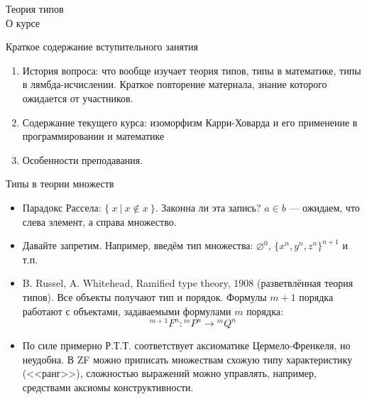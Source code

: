 \documentclass[aspectratio=169]{beamer}
\begin{document}
\newtheorem{dfn}{Определение}[section]
\newtheorem{nte}{Замечание}[section]

\newtheorem{axiom}{Аксиома}[section]
\newtheorem{thm}{Теорема}[section]
\newtheorem{lmm}[theorem]{Лемма}
\newtheorem{statement}{Утверждение}[section]
\newtheorem{oun_paragraph}{Пункт}[section]
\newtheorem{cons}{Следствие}[section]
\newtheorem*{exm}{Пример}

\newcommand{\comb}[1]{\operatorname{\mathcal{#1}}}
\newcommand{\func}[1]{\operatorname{#1}}
\newcommand{\reduction}[1]{{\color{OrangeRed}#1}}
\newcommand{\set}[1]{\left\{#1\right\}}

\def\from#1{\par \parbox{0.7\textwidth}{\par \hfill\raggedleft \it #1}} 

\begin{frame}{}
\begin{center}
{\LARGE Теория типов}\\\vspace{1cm}
\large О курсе
\end{center}
\end{frame}

\begin{frame}{Краткое содержание вступительного занятия}
\begin{enumerate}
\item История вопроса: что вообще изучает теория типов, типы в математике, типы в лямбда-исчислении.
Краткое повторение материала, знание которого ожидается от участников.
\item Содержание текущего курса: изоморфизм Карри-Ховарда и его применение в программировании и математике
\item Особенности преподавания.
\end{enumerate}
\end{frame}

\begin{frame}{Типы в теории множеств}
\begin{itemize}
\item Парадокс Рассела: $\{\ x\ |\ x \notin x\ \}$. Законна ли эта запись?
$a \in b$ --- ожидаем, что слева элемент, а справа множество. %

\item Давайте запретим. Например, введём тип множества: $\varnothing^0$, $\{ x^n, y^n, z^n \}^{n+1}$ и т.п.

\item B. Russel, A. Whitehead, Ramified type theory, 1908 (разветвлённая теория типов).
Все объекты получают тип и порядок. Формулы $m+1$ порядка работают с объектами, задаваемыми формулами $m$ порядка:
$$^{m+1}F^{n} : {}^{m}P^{n} \rightarrow {}^{m}Q^{n}$$

\item По силе примерно Р.Т.Т. соответствует аксиоматике Цермело-Френкеля, но неудобна.
В ZF можно приписать множествам схожую типу характеристику (<<ранг>>), сложностью выражений можно 
управлять, например, средствами аксиомы конструктивности.
\end{itemize}
\end{frame}
\end{document}
